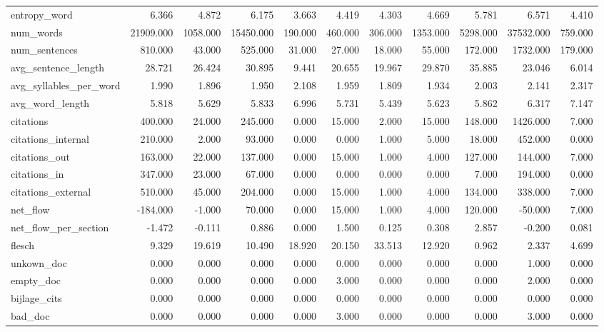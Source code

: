 \begin{tabular}{lrrrrrrrrrr}
\cline{1-11}
entropy\_word & 6.366 & 4.872 & 6.175 & 3.663 & 4.419 & 4.303 & 4.669 & 5.781 & 6.571 & 4.410 \\
\cline{1-11}
num\_words & 21909.000 & 1058.000 & 15450.000 & 190.000 & 460.000 & 306.000 & 1353.000 & 5298.000 & 37532.000 & 759.000 \\
\cline{1-11}
num\_sentences & 810.000 & 43.000 & 525.000 & 31.000 & 27.000 & 18.000 & 55.000 & 172.000 & 1732.000 & 179.000 \\
\cline{1-11}
avg\_sentence\_length & 28.721 & 26.424 & 30.895 & 9.441 & 20.655 & 19.967 & 29.870 & 35.885 & 23.046 & 6.014 \\
\cline{1-11}
avg\_syllables\_per\_word & 1.990 & 1.896 & 1.950 & 2.108 & 1.959 & 1.809 & 1.934 & 2.003 & 2.141 & 2.317 \\
\cline{1-11}
avg\_word\_length & 5.818 & 5.629 & 5.833 & 6.996 & 5.731 & 5.439 & 5.623 & 5.862 & 6.317 & 7.147 \\
\cline{1-11}
citations & 400.000 & 24.000 & 245.000 & 0.000 & 15.000 & 2.000 & 15.000 & 148.000 & 1426.000 & 7.000 \\
\cline{1-11}
citations\_internal & 210.000 & 2.000 & 93.000 & 0.000 & 0.000 & 1.000 & 5.000 & 18.000 & 452.000 & 0.000 \\
\cline{1-11}
citations\_out & 163.000 & 22.000 & 137.000 & 0.000 & 15.000 & 1.000 & 4.000 & 127.000 & 144.000 & 7.000 \\
\cline{1-11}
citations\_in & 347.000 & 23.000 & 67.000 & 0.000 & 0.000 & 0.000 & 0.000 & 7.000 & 194.000 & 0.000 \\
\cline{1-11}
citations\_external & 510.000 & 45.000 & 204.000 & 0.000 & 15.000 & 1.000 & 4.000 & 134.000 & 338.000 & 7.000 \\
\cline{1-11}
net\_flow & -184.000 & -1.000 & 70.000 & 0.000 & 15.000 & 1.000 & 4.000 & 120.000 & -50.000 & 7.000 \\
\cline{1-11}
net\_flow\_per\_section & -1.472 & -0.111 & 0.886 & 0.000 & 1.500 & 0.125 & 0.308 & 2.857 & -0.200 & 0.081 \\
\cline{1-11}
flesch & 9.329 & 19.619 & 10.490 & 18.920 & 20.150 & 33.513 & 12.920 & 0.962 & 2.337 & 4.699 \\
\cline{1-11}
unkown\_doc & 0.000 & 0.000 & 0.000 & 0.000 & 0.000 & 0.000 & 0.000 & 0.000 & 1.000 & 0.000 \\
\cline{1-11}
empty\_doc & 0.000 & 0.000 & 0.000 & 0.000 & 3.000 & 0.000 & 0.000 & 0.000 & 2.000 & 0.000 \\
\cline{1-11}
bijlage\_cits & 0.000 & 0.000 & 0.000 & 0.000 & 0.000 & 0.000 & 0.000 & 0.000 & 0.000 & 0.000 \\
\cline{1-11}
bad\_doc & 0.000 & 0.000 & 0.000 & 0.000 & 3.000 & 0.000 & 0.000 & 0.000 & 3.000 & 0.000 \\
\cline{1-11}
\bottomrule
\end{tabular}
